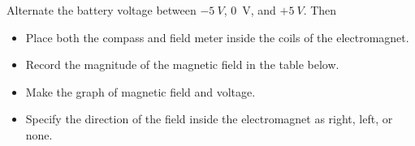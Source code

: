 \documentclass[]{exam}
\begin{document}
\begin{questions}

\ifprintanswers \else \clearpage \fi

\question
Alternate the battery voltage between $\SI{-5}{V}$, \SI{0}{V}, and $+\SI{5}{V}$. Then

\begin{itemize}
    \item Place both the compass and field meter inside the coils of the electromagnet.
    \item Record the magnitude of the magnetic field in the table below. 
    \item Make the graph of magnetic field and voltage.
    \item Specify the direction of the field inside the electromagnet as right, left, or none.
\end{itemize}



\end{questions}
\end{document}
